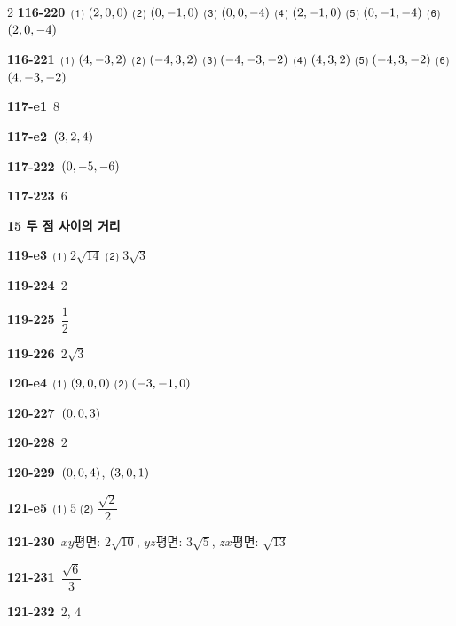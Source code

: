 \documentclass[10pt,a4paper]{article}
\begin{document}
\begin{multicols}{2}
\noindent\textbf{116-220}\ ⑴ $(2{,}\mkern3mu\mathopen{}0{,}\mkern3mu\mathopen{}0)$ ⑵ $(0{,}\mkern3mu\mathopen{}-1{,}\mkern3mu\mathopen{}0)$ ⑶ $(0{,}\mkern3mu\mathopen{}0{,}\mkern3mu\mathopen{}-4)$ ⑷ $(2{,}\mkern3mu\mathopen{}-1{,}\mkern3mu\mathopen{}0)$ ⑸ $(0{,}\mkern3mu\mathopen{}-1{,}\mkern3mu\mathopen{}-4)$ ⑹ $(2{,}\mkern3mu\mathopen{}0{,}\mkern3mu\mathopen{}-4)$\par
\noindent\textbf{116-221}\ ⑴ $(4{,}\mkern3mu\mathopen{}-3{,}\mkern3mu\mathopen{}2)$ ⑵ $(-4{,}\mkern3mu\mathopen{}3{,}\mkern3mu\mathopen{}2)$ ⑶ $(-4{,}\mkern3mu\mathopen{}-3{,}\mkern3mu\mathopen{}-2)$ ⑷ $(4{,}\mkern3mu\mathopen{}3{,}\mkern3mu\mathopen{}2)$ ⑸ $(-4{,}\mkern3mu\mathopen{}3{,}\mkern3mu\mathopen{}-2)$ ⑹ $(4{,}\mkern3mu\mathopen{}-3{,}\mkern3mu\mathopen{}-2)$\par
\noindent\textbf{117-e1}\ $8$\par
\noindent\textbf{117-e2}\ $(3{,}\mkern3mu\mathopen{}2{,}\mkern3mu\mathopen{}4)$\par
\noindent\textbf{117-222}\ $(0{,}\mkern3mu\mathopen{}-5{,}\mkern3mu\mathopen{}-6)$\par
\noindent\textbf{117-223}\ $6$\par
\noindent\textbf{15 두 점 사이의 거리}\par\smallskip
\noindent\textbf{119-e3}\ ⑴ $2\sqrt{14}$ ⑵ $3\sqrt{3}$\par
\noindent\textbf{119-224}\ $2$\par
\noindent\textbf{119-225}\ $\dfrac{1}{2}$\par
\noindent\textbf{119-226}\ $2\sqrt{3}$\par
\noindent\textbf{120-e4}\ ⑴ $(9{,}\mkern3mu\mathopen{}0{,}\mkern3mu\mathopen{}0)$ ⑵ $(-3{,}\mkern3mu\mathopen{}-1{,}\mkern3mu\mathopen{}0)$\par
\noindent\textbf{120-227}\ $(0{,}\mkern3mu\mathopen{}0{,}\mkern3mu\mathopen{}3)$\par
\noindent\textbf{120-228}\ $2$\par
\noindent\textbf{120-229}\ $(0{,}\mkern3mu\mathopen{}0{,}\mkern3mu\mathopen{}4)$, $(3{,}\mkern3mu\mathopen{}0{,}\mkern3mu\mathopen{}1)$\par
\noindent\textbf{121-e5}\ ⑴ $5$ ⑵ $\dfrac{\sqrt{2}}{2}$\par
\noindent\textbf{121-230}\ $xy$평면: $2\sqrt{10}$, $yz$평면: $3\sqrt{5}$, $zx$평면: $\sqrt{13}$\par
\noindent\textbf{121-231}\ $\dfrac{\sqrt{6}}{3}$\par
\noindent\textbf{121-232}\ $2$, $4$\par

\end{multicols}
\end{document}
